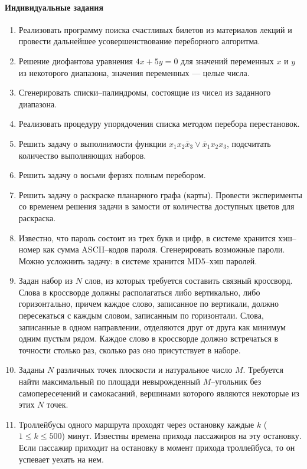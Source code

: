 \documentclass[12pt, openany, oneside]{book} %
\begin{document}
\paragraph{Индивидуальные задания}
\begin{enumerate}
\item Реализовать программу поиска счастливых билетов из материалов лекций и провести дальнейшее усовершенствование переборного алгоритма.
\item Решение диофантова уравнения $4x+5y=0$ для значений переменных $x$ и $y$ из некоторого диапазона, значения переменных --- целые числа.
\item Сгенерировать списки--палиндромы, состоящие из чисел из заданного диапазона.
\item Реализовать процедуру упорядочения списка методом перебора перестановок.
\item Решить задачу о выполнимости функции $x_1x_2\bar{x}_3\vee \bar{x}_1x_2x_3$, подсчитать количество выполняющих наборов.
\item Решить задачу о восьми ферзях полным перебором.
\item Решить задачу о раскраске планарного графа (карты). Провести эксперименты со временем решения задачи в замости от количества доступных цветов для раскраска.
\item Известно, что пароль состоит из трех букв и цифр, в системе хранится хэш--номер как сумма ASCII--кодов пароля. Сгенерировать возможные пароли. Можно усложнить задачу: в системе хранится MD5--хэш паролей.
\item Задан набор из $N$ слов, из которых требуется составить связный кроссворд. Слова в кроссворде должны располагаться либо вертикально, либо горизонтально, причем каждое слово, записанное по вертикали, должно пересекаться с каждым словом, записанным по горизонтали. Слова, записанные в одном направлении, отделяются друг от друга как минимум одним пустым рядом. Каждое слово в кроссворде должно встречаться в точности столько раз, сколько раз оно присутствует в наборе.
\item Заданы $N$ различных точек плоскости и натуральное число $M$. Требуется найти максимальный по площади невырожденный $M$--угольник без самопересечений и самокасаний, вершинами которого являются некоторые из этих $N$ точек.
\item Троллейбусы одного маршрута проходят через остановку
каждые $k$ ($1\leq{}k\leq{}500$) минут. Известны времена прихода пассажиров
на эту остановку. Если пассажир приходит на остановку в
момент прихода троллейбуса, то он успевает уехать на нем.


\end{enumerate}
\end{document}

